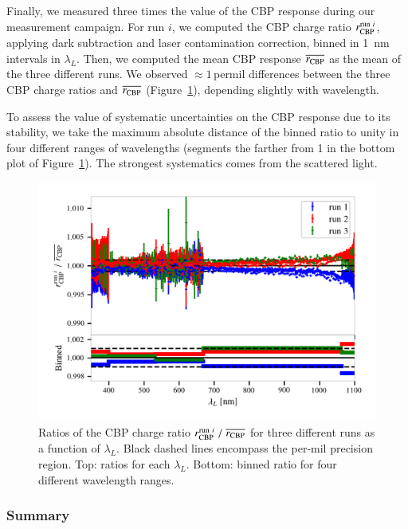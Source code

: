 Finally, we measured three times the value of the CBP response during our measurement campaign. For run $i$, we computed the CBP charge ratio $r_{\rm CBP}^{\mathrm{run}\ i}$, applying dark subtraction and laser contamination correction, binned in \SI{1}{\nano\meter} intervals in $\lambda_L$. Then, we computed the mean CBP response $\overline{r_{\rm CBP}}$ as the mean of the three different runs. We observed $\approx 1$\,permil differences between the three CBP charge ratios and $\overline{r_{\rm CBP}}$ (Figure~\ref{fig:SCrepeatability}), depending slightly with wavelength.


To assess the value of systematic uncertainties on the CBP response due to its stability, we take the maximum absolute distance of the binned ratio to unity in four different ranges of wavelengths (segments the farther from 1 in the bottom plot of Figure~\ref{fig:SCrepeatability}). The strongest systematics comes from the scattered light.

\begin{figure}[h]
    \centering
    \includegraphics[width=\columnwidth]{fig/sc_runi_ratios.png}
    \caption{Ratios of the CBP charge ratio $r_{\rm CBP}^{\mathrm{run}\ i}\;/\;\overline{r_{\rm CBP}}$ for three different runs as a function of $\lambda_L$. Black dashed lines encompass the per-mil precision region. Top: ratios for each $\lambda_L$. Bottom: binned ratio for four different wavelength ranges.}
    \label{fig:SCrepeatability}
\end{figure}

\subsubsection{Summary}\label{sec:cbp_summary}

